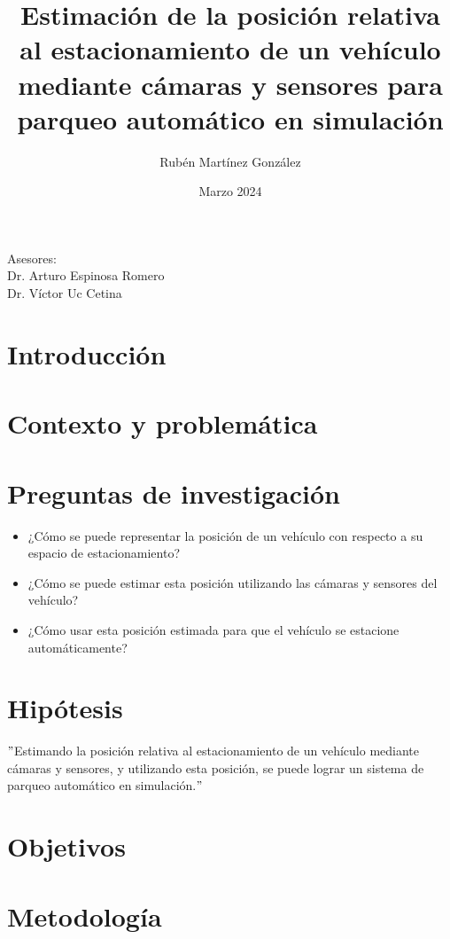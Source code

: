 \documentclass[12pt,letterpaper,final]{article}
\title{Estimación de la posición relativa al estacionamiento de un vehículo mediante cámaras y sensores para parqueo automático en simulación}
\author{Rubén Martínez González}
\date{Marzo 2024}
\begin{document}
    \maketitle
    \begin{center}
        Asesores: \\Dr. Arturo Espinosa Romero\\ Dr. Víctor Uc Cetina

    \end{center}
    \clearpage

    \section*{Introducción}
    
    \clearpage

    \section*{Contexto y problemática}
    
    \clearpage

    \section*{Preguntas de investigación}
    \begin{itemize}
        \item ¿Cómo se puede representar la posición de un vehículo con respecto a su espacio de estacionamiento?
        \item ¿Cómo se puede estimar esta posición utilizando las cámaras y sensores del vehículo?
        \item ¿Cómo usar esta posición estimada para que el vehículo se estacione automáticamente?
    \end{itemize}

    \section*{Hipótesis}
    \("\)Estimando la posición relativa al estacionamiento de un vehículo mediante cámaras y sensores,
    y utilizando esta posición, se puede lograr un sistema de parqueo automático en simulación.\("\)

    \section*{Objetivos}
    
    \clearpage

    \section*{Metodología}
    \justify
    
\end{document}
